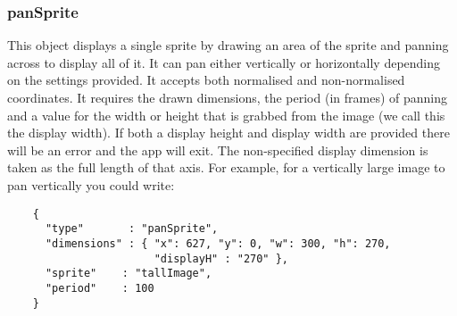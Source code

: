 \documentclass[a4paper]{article}
\begin{document}
  \subsubsection{panSprite}
  This object displays a single sprite by drawing an area of the sprite and
  panning across to display all of it. It can pan either vertically or
  horizontally depending on the settings provided. It accepts both
  normalised and non-normalised coordinates. It requires the drawn
  dimensions, the period (in frames) of panning and a value for the width
  or height that is grabbed from the image (we call this the display width).
  If both a display height and display width are provided there will be an
  error and the app will exit. The non-specified display dimension is taken
  as the full length of that axis. For example, for a vertically large image
  to pan vertically you could write:


  \begin{verbatim}
    {
      "type"       : "panSprite",
      "dimensions" : { "x": 627, "y": 0, "w": 300, "h": 270, 
                       "displayH" : "270" },
      "sprite"    : "tallImage",
      "period"    : 100
    }  
  \end{verbatim}
\end{document}
